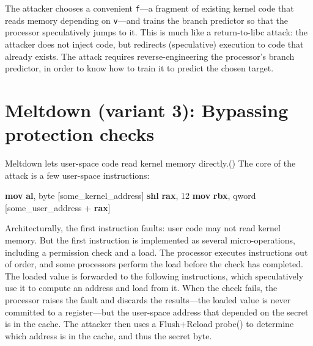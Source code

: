 \documentclass[
  letterpaper,
]{scrbook}
\newenvironment{Shaded}{\begin{snugshade}}{\end{snugshade}}
\newcommand{\DataTypeTok}[1]{\textcolor[rgb]{0.68,0.00,0.00}{#1}}
\newcommand{\DecValTok}[1]{\textcolor[rgb]{0.68,0.00,0.00}{#1}}
\newcommand{\KeywordTok}[1]{\textcolor[rgb]{0.00,0.23,0.31}{\textbf{#1}}}
\newcommand{\NormalTok}[1]{\textcolor[rgb]{0.00,0.23,0.31}{#1}}
\newcommand{\OperatorTok}[1]{\textcolor[rgb]{0.37,0.37,0.37}{#1}}
\theoremstyle{definition}
\theoremstyle{plain}
\theoremstyle{plain}
\theoremstyle{remark}
\begin{document}
The attacker chooses a convenient \texttt{f}---a fragment of existing
kernel code that reads memory depending on \texttt{v}---and trains the
branch predictor so that the processor speculatively jumps to it. This
is much like a return-to-libc attack: the attacker does not inject code,
but redirects (speculative) execution to code that already exists. The
attack requires reverse-engineering the processor's branch predictor, in
order to know how to train it to predict the chosen target.

\section{Meltdown (variant 3): Bypassing protection
checks}\label{meltdown-variant-3-bypassing-protection-checks}

Meltdown lets user-space code read kernel memory
directly.() The core of
the attack is a few user-space instructions:

\begin{Shaded}
\begin{Highlighting}[]
\KeywordTok{mov}  \KeywordTok{al}\OperatorTok{,} \DataTypeTok{byte} \OperatorTok{[}\NormalTok{some\_kernel\_address}\OperatorTok{]}
\KeywordTok{shl}  \KeywordTok{rax}\OperatorTok{,} \DecValTok{12}
\KeywordTok{mov}  \KeywordTok{rbx}\OperatorTok{,} \DataTypeTok{qword} \OperatorTok{[}\NormalTok{some\_user\_address }\OperatorTok{+} \KeywordTok{rax}\OperatorTok{]}
\end{Highlighting}
\end{Shaded}

{}
Architecturally, the first instruction faults: user code may not read
kernel memory. But the first instruction is implemented as several
micro-operations, including a permission check and a load. The processor
executes instructions out of order, and some processors perform the load
before the check has completed. The loaded value is forwarded to the
following instructions, which speculatively use it to compute an address
and load from it. When the check fails, the processor raises the fault
and discards the results---the loaded value is never committed to a
register---but the user-space address that depended on the secret is in
the cache. The attacker then uses a Flush+Reload
probe() to
determine which address is in the cache, and thus the secret byte.
\end{document}
